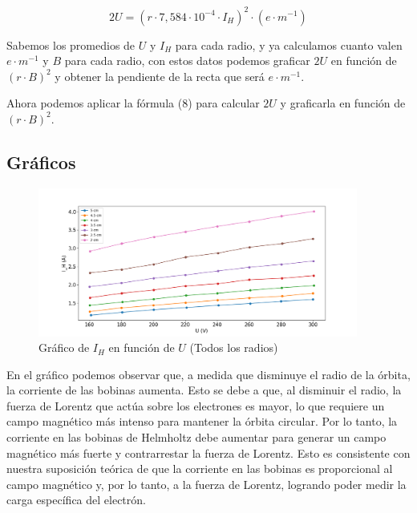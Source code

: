 \documentclass[a4paper]{article}
\begin{document}
    \begin{equation}
        2U = (r \cdot 7,584 \cdot 10^{-4} \cdot I_H)^2 \cdot (e \cdot m^{-1})
    \end{equation}

    \indent Sabemos los promedios de $U$ y $I_H$ para cada radio, y ya calculamos cuanto valen $e \cdot m^{-1}$ y $B$ para cada radio, con estos datos podemos graficar $2U$ en función de $(r \cdot B)^2$ y obtener la pendiente de la recta que será $e \cdot m^{-1}$.



    \indent Ahora podemos aplicar la fórmula (8) para calcular $2U$ y graficarla en función de $(r \cdot B)^2$. 
   
    \newpage
    \noindent
    \thispagestyle{fancy}
    
    \subsection{Gráficos}
    
    \begin{figure}[h!]
        \centering
        \includegraphics[width = 10.5cm] {../imagenes/graficoI_HyU.png}
        \caption{Gráfico de $I_H$ en función de $U$ (Todos los radios)}
    \end{figure}

    \indent En el gráfico podemos observar que, a medida que disminuye el radio de la órbita, la corriente de las bobinas aumenta. Esto se debe a que, al disminuir el radio, la fuerza de Lorentz que actúa sobre los electrones es mayor, lo que requiere un campo magnético más intenso para mantener la órbita circular. Por lo tanto, la corriente en las bobinas de Helmholtz debe aumentar para generar un campo magnético más fuerte y contrarrestar la fuerza de Lorentz. Esto es consistente con nuestra suposición teórica de que la corriente en las bobinas es proporcional al campo magnético y, por lo tanto, a la fuerza de Lorentz, logrando poder medir la carga específica del electrón.
\end{document}

